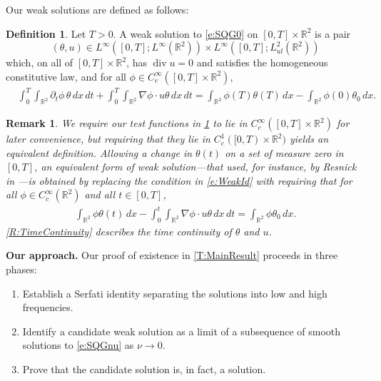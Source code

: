 \documentclass[11pt,reqno,xcolor=svgnames]{amsart}
\def\R{{\mathbb R}}
\theoremstyle{plain}
\theoremstyle{definition}
\newtheorem{definition}[theorem]{Definition}
\theoremstyle{plain}
\newtheorem{remark}[theorem]{Remark}
\theoremstyle{remark}
\DeclareMathOperator{\dv}{div}
\newcommand{\iny}{\ensuremath{\infty}}
\newcommand{\grad}{\ensuremath{\nabla}}
\newenvironment{Indent}
  {%
  \begin{list}{}%
    {\setlength{\leftmargin}{3em}%
     \setlength{\rightmargin}{0pt}}%
   \item\relax}
  {\end{list}}
\begin{document}
    Our weak solutions are defined as follows:

    \begin{definition}\label{weaksolutiondef2}
    Let $T>0$.  A weak solution to \cref{e:SQG0} on $[0,T] \times \R^2$ is a pair 
    \begin{equation}\label{regularitycondition}
    (\theta, u) \in L^{\infty}([0,T]; L^{\infty}(\R^2))\times L^{\infty}([0,T]; L^2_{ul}(\R^2))
    \end{equation}
    which, on all of $[0, T] \times \R^2$, has $\dv u = 0$ and  satisfies the homogeneous constitutive law, and for all $\phi\in C_c^\iny([0,T]\times \R^2)$, 
    \begin{equation}\label{e:WeakId}
    \begin{split}
    &\int_{0}^T\int_{\R^2} \partial_t \phi \, \theta \, dx \, dt  +\int_{0}^T\int_{\R^2} \nabla \phi \cdot u\theta \, dx \, dt = \int_{\R^2} \phi(T) \theta(T)\, dx-\int_{\R^2} \phi(0) \theta_0\, dx. 
    \end{split}
    \end{equation}
    \end{definition}

    \begin{remark}\label{R:WeakerTestFunctions}
        We require our test functions in \cref{weaksolutiondef2} to lie in $C_c^\iny([0,T]\times \R^2)$ for later convenience, but requiring that they lie in $C^1_c([0, T) \times \R^2)$  yields an equivalent definition. Allowing a change in $\theta(t)$ on a set of measure zero in $[0, T]$, an equivalent form of weak solution---that used, for instance, by Resnick in \cite{Resnick}---is obtained by replacing the condition in \cref{e:WeakId} with requiring that for all $\phi \in C_c^\iny(\R^2)$ and all $t \in [0, T]$,
        \begin{align*}
            \int_{\R^2} \phi \theta(t) \, dx
                - \int_0^t \int_{\R^2} \grad \phi \cdot u \theta \, dx \, dt
                = \int_{\R^2} \phi \theta_0 \, dx.
        \end{align*} 
        \cref{R:TimeContinuity} describes the time continuity of $\theta$ and $u$.
    \end{remark}




\smallskip\noindent\textbf{Our approach.}
Our proof of existence in \cref{T:MainResult} proceeds in three  phases:
\begin{Indent}
    \begin{enumerate}[label=\Roman*, align=left]
        \item Establish a Serfati identity separating the solutions into low and high frequencies.
    
        \item Identify a candidate weak solution as a limit of a subsequence of smooth solutions to \cref{e:SQGnu} as $\nu \to 0$.
    
        \item Prove that the candidate solution is, in fact, a solution.
    \end{enumerate}
\end{Indent}
\end{document}

